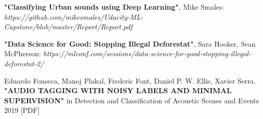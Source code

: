 \documentclass[11pt, a4papper]{report}
\theoremstyle{plain}
\theoremstyle{definition}
\theoremstyle{definition}
\theoremstyle{proposition}
\begin{document}
\begin{thebibliography}{1}
 \textbf{"Classifying Urban sounds using Deep Learning"}, Mike Smales: \textit{https://github.com/mikesmales/Udacity-ML-Capstone/blob/master/Report/Report.pdf}

 \textbf{"Data Science for Good: Stopping Illegal Deforestat"}, Sara Hooker, Sean McPherson: \textit{https://mlconf.com/sessions/data-science-for-good-stopping-illegal-deforestat-2/}

 Eduardo Fonseca, Manoj Plakal, Frederic Font, Daniel P. W. Ellis, Xavier Serra.\\ \textbf{"AUDIO TAGGING WITH NOISY LABELS AND MINIMAL SUPERVISION"} in Detection and Classification of Acoustic Scenes and Events 2019 [PDF]
\end{thebibliography}
\end{document}
